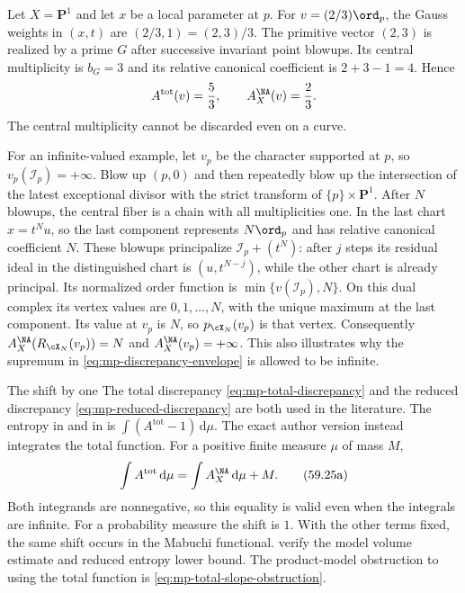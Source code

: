 \begin{example}\label{ex:mp-discrepancy-curve-normalization}
Let $X=\mathbf P^1$ and let $x$ be a local parameter at $p$.
For $v=(2/3)\ord_p$, the Gauss weights in $(x,t)$ are
$(2/3,1)=(2,3)/3$. The primitive vector $(2,3)$ is realized
by a prime $G$ after successive invariant point blowups.
Its central multiplicity is $b_G=3$ and its relative
canonical coefficient is $2+3-1=4$. Hence
\[
                 A^{\mathrm{tot}}(v)=\frac53,
                 \qquad A_X^{\NA}(v)=\frac23.
\]
The central multiplicity cannot be discarded even on a curve.

For an infinite-valued example, let $v_p$ be the character
supported at $p$, so $v_p(\mathcal I_p)=+\infty$.
Blow up $(p,0)$ and then repeatedly blow up the intersection
of the latest exceptional divisor with the strict transform
of $\{p\}\times\mathbf P^1$. After $N$ blowups, the central
fiber is a chain with all multiplicities one. In the last
chart $x=t^Nu$, so the last component represents
$N\ord_p$ and has relative canonical coefficient $N$.
These blowups principalize $\mathcal I_p+(t^N)$: after $j$
steps its residual ideal in the distinguished chart is
$(u,t^{N-j})$, while the other chart is already principal.
Its normalized order function is
$\min\{v(\mathcal I_p),N\}$. On this dual complex its vertex
values are $0,1,\ldots,N$, with the unique maximum at the
last component. Its value at $v_p$ is $N$, so $p_{\cX_N}(v_p)$
is that vertex. Consequently
$A_X^{\NA}(R_{\cX_N}(v_p))=N$ and $A_X^{\NA}(v_p)=+\infty$.
This also illustrates why the supremum in
\eqref{eq:mp-discrepancy-envelope} is allowed to be infinite.
\end{example}

\begin{warning}{The shift by one}
\label{warn:mp-discrepancy-shift}
The total discrepancy \eqref{eq:mp-total-discrepancy} and the
reduced discrepancy \eqref{eq:mp-reduced-discrepancy} are both
used in the literature. The entropy in
\cite[Definition~2.4.1]{MPWN25} and in
 is
$\int(A^{\mathrm{tot}}-1)\,\mathrm{d}\mu$.
The exact author version
\cite[equation~(3.2.4) and Definition~6.2.1,
pp.~32 and~51]{MPTropicalV2} instead integrates the total
function. For a positive finite measure $\mu$ of mass $M$,
\[
 \int A^{\mathrm{tot}}\,\mathrm d\mu
       =\int A_X^{\NA}\,\mathrm d\mu+M.
\tag{59.25a}\label{eq:mp-entropy-mass-shift}
\]
Both integrands are nonnegative, so this equality is valid even when the
integrals are infinite. For a probability measure the shift is $1$. With the other terms fixed, the
same shift occurs in the Mabuchi functional.
verify the model volume estimate and reduced entropy lower
bound. The product-model obstruction to using the total
function is \eqref{eq:mp-total-slope-obstruction}.
\end{warning}


